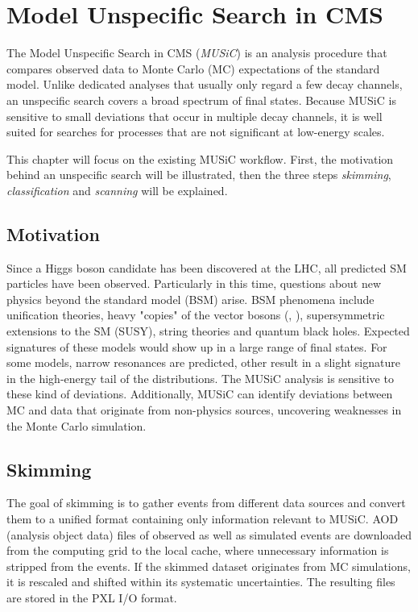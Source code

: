 
\chapter{Model Unspecific Search in CMS}

The Model Unspecific Search in CMS (\emph{MUSiC}) is an analysis procedure that compares observed data to Monte Carlo (MC) expectations of the standard model. Unlike dedicated analyses that usually only regard a few decay channels, an unspecific search covers a broad spectrum of final states. Because MUSiC is sensitive to small deviations that occur in multiple decay channels, it is well suited for searches for processes that are not significant at low-energy scales.

This chapter will focus on the existing MUSiC workflow. First, the motivation behind an unspecific search will be illustrated, then the three steps \emph{skimming}, \emph{classification} and \emph{scanning} will be explained\cite{Pieta2012MUSiC,Papacz2014Model}.

\section{Motivation}
Since a Higgs boson candidate has been discovered at the LHC\cite{Ao2015Combined}, all predicted SM particles have been observed. Particularly in this time, questions about new physics beyond the standard model (BSM) arise. 
BSM phenomena include unification theories, heavy "copies" of the vector bosons (\PZprime, \PWprime), supersymmetric extensions to the SM (SUSY), string theories and quantum black holes.
Expected signatures of these models would show up in a large range of final states. For some models, narrow resonances are predicted, other result in a slight signature in the high-energy tail of the distributions.
The MUSiC analysis is sensitive to these kind of deviations.
Additionally, MUSiC can identify deviations between MC and data that originate from non-physics sources, uncovering weaknesses in the Monte Carlo simulation.

\section{Skimming}
The goal of skimming is to gather events from different data sources and convert them to a unified format containing only information relevant to MUSiC. AOD (analysis object data) files of observed as well as simulated events are downloaded from the computing grid to the local cache, where unnecessary information is stripped from the events. If the skimmed dataset originates from MC simulations, it is rescaled and shifted within its systematic uncertainties.
The resulting files are stored in the PXL I/O format\cite{BBE+2012Development}.

